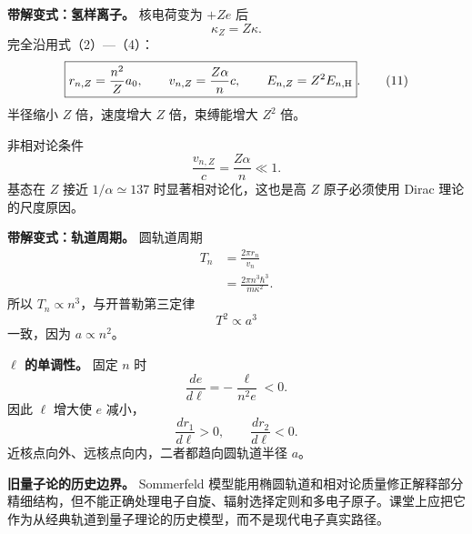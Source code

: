 \documentclass[12pt,a4paper,UTF8]{ctexart}
\begin{document}
\textbf{带解变式：氢样离子。} 核电荷变为 \(+Ze\) 后 \[
\kappa_Z=Z\kappa.
\] 完全沿用式（2）---（4）： \[
\boxed{
r_{n,Z}=\frac{n^2}{Z}a_0,\qquad
v_{n,Z}=\frac{Z\alpha}{n}c,\qquad
E_{n,Z}=Z^2E_{n,{\rm H}}
}. \tag{11}
\] 半径缩小 \(Z\) 倍，速度增大 \(Z\) 倍，束缚能增大 \(Z^2\) 倍。

非相对论条件 \[
\frac{v_{n,Z}}c=\frac{Z\alpha}{n}\ll1.
\] 基态在 \(Z\) 接近 \(1/\alpha\simeq137\) 时显著相对论化，这也是高
\(Z\) 原子必须使用 Dirac 理论的尺度原因。

\textbf{带解变式：轨道周期。} 圆轨道周期 \[
\begin{aligned}
T_n
&=\frac{2\pi r_n}{v_n}\\
&=\frac{2\pi n^3\hbar^3}{m\kappa^2}.
\end{aligned} \tag{12}
\] 所以 \(T_n\propto n^3\)，与开普勒第三定律 \[
T^2\propto a^3
\] 一致，因为 \(a\propto n^2\)。

\textbf{\(\ell\) 的单调性。} 固定 \(n\) 时 \[
\frac{de}{d\ell}
=-\frac{\ell}{n^2e}<0.
\] 因此 \(\ell\) 增大使 \(e\) 减小， \[
\frac{dr_1}{d\ell}>0,\qquad
\frac{dr_2}{d\ell}<0.
\] 近核点向外、远核点向内，二者都趋向圆轨道半径 \(a\)。

\textbf{旧量子论的历史边界。} Sommerfeld
模型能用椭圆轨道和相对论质量修正解释部分精细结构，但不能正确处理电子自旋、辐射选择定则和多电子原子。课堂上应把它作为从经典轨道到量子理论的历史模型，而不是现代电子真实路径。
\end{document}
